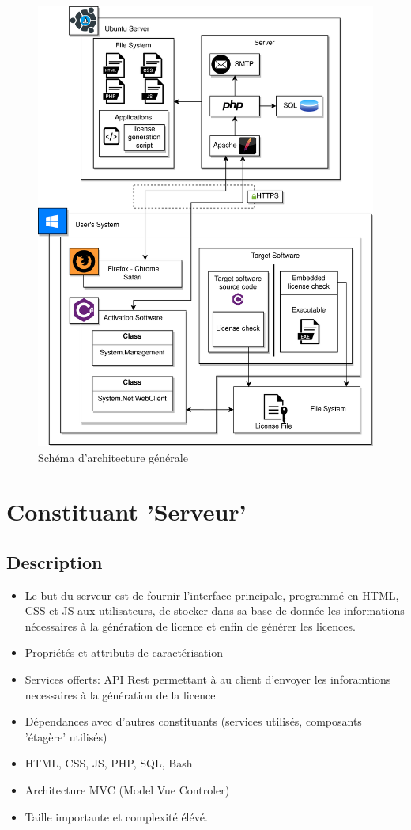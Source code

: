 \begin{figure}[h!]
	\centering
	\includegraphics{../png/DAT_general.png}
	\caption{Schéma d'architecture générale}
	\label{fig:fig1}
\end{figure}
\newpage

\section{Constituant 'Serveur'}
\subsection{Description}
\begin{itemize}
	\item Le but du serveur est de fournir l'interface principale, programmé 
				en HTML, CSS et JS aux utilisateurs, de stocker dans sa base de donnée
				les informations nécessaires à la génération de licence et enfin de générer 
				les licences.
	\item Propriétés et attributs de caractérisation
	\item Services offerts: API Rest permettant à au client d'envoyer les inforamtions
				necessaires à la génération de la licence 
	\item Dépendances avec d’autres constituants (services utilisés, composants 'étagère' utilisés)
	\item HTML, CSS, JS, PHP, SQL, Bash 
	\item Architecture MVC (Model Vue Controler)
	\item Taille importante et complexité élévé.
\end{itemize}
